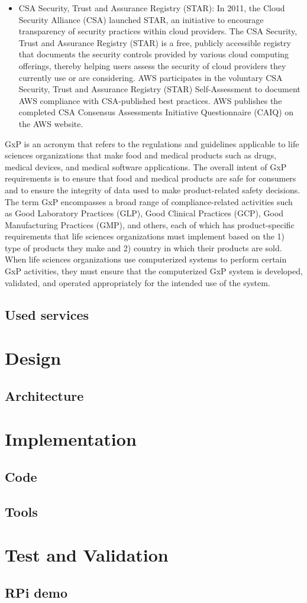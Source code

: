 \begin{itemize}
    \item CSA Security, Trust and Assurance Registry (STAR): In 2011, the Cloud Security Alliance (CSA) launched STAR, an initiative to encourage transparency of security practices within cloud providers. The CSA Security, Trust and Assurance Registry (STAR) is a free, publicly accessible registry that documents the security controls provided by various cloud computing offerings, thereby helping users assess the security of cloud providers they currently use or are considering. AWS participates in the voluntary CSA Security, Trust and Assurance Registry (STAR) Self-Assessment to document AWS compliance with CSA-published best practices. AWS publishes the completed CSA Consensus Assessments Initiative Questionnaire (CAIQ) on the AWS website.
\end{itemize}

GxP is an acronym that refers to the regulations and guidelines applicable to life sciences organizations that make food and medical products such as drugs, medical devices, and medical software applications. The overall intent of GxP requirements is to ensure that food and medical products are safe for consumers and to ensure the integrity of data used to make product-related safety decisions. The term GxP encompasses a broad range of compliance-related activities such as Good Laboratory Practices (GLP), Good Clinical Practices (GCP), Good Manufacturing Practices (GMP), and others, each of which has product-specific requirements that life sciences organizations must implement based on the 1) type of products they make and 2) country in which their products are sold. When life sciences organizations use computerized systems to perform certain GxP activities, they must ensure that the computerized GxP system is developed, validated, and operated appropriately for the intended use of the system. \cite{GxPCompliance}
\subsection{Used services}

\section{Design}
\subsection{Architecture}

\section{Implementation}
\subsection{Code}
\subsection{Tools}

\section{Test and Validation}
\subsection{RPi demo}